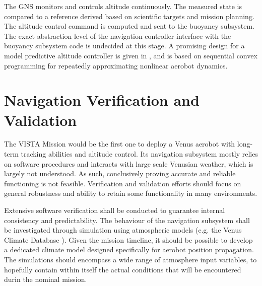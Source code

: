 The GNS monitors and controls altitude continuously. The measured state is compared to a reference derived based on scientific targets and mission planning. The altitude control command is computed and sent to the buoyancy subsystem. The exact abstraction level of the navigation controller interface with the buoyancy subsystem code is undecided at this stage. A promising design for a model predictive altitude controller is given in \cite{apostol2025}, and is based on sequential convex programming for repeatedly approximating nonlinear aerobot dynamics.

\section{Navigation Verification and Validation}
The VISTA Mission would be the first one to deploy a Venus aerobot with long-term tracking abilities and altitude control. Its navigation subsystem mostly relies on software procedures and interacts with large scale Venusian weather, which is largely not understood. As such, conclusively proving accurate and reliable functioning is not feasible. Verification and validation efforts should focus on general robustness and ability to retain some functionality in many environments.

Extensive software verification shall be conducted to guarantee internal consistency and predictability. The behaviour of the navigation subsystem shall be investigated through simulation using atmospheric models (e.g. the Venus Climate Database \cite{VenusClimateDatabase}). Given the mission timeline, it should be possible to develop a dedicated climate model designed specifically for aerobot position propagation. The simulations should encompass a wide range of atmosphere input variables, to hopefully contain within itself the actual conditions that will be encountered durin the nominal mission.

